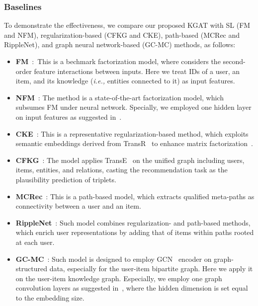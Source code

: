 \documentclass[sigconf]{acmart}
\newcommand{\ie}{\emph{i.e., }}
\theoremstyle{definition}
\begin{document}
\subsubsection{\textbf{Baselines}}
To demonstrate the effectiveness, we compare our proposed KGAT with SL (FM and NFM), regularization-based (CFKG and CKE), path-based (MCRec and RippleNet), and graph neural network-based (GC-MC) methods, as follows:

\begin{itemize}[leftmargin=*]
	\item \textbf{FM}~\cite{FM}:~This is a bechmark factorization model, where considers the second-order feature interactions between inputs. Here we treat IDs of a user, an item, and its knowledge (\ie entities connected to it) as input features.
	
	\item \textbf{NFM}~\cite{NFM}: The method is a state-of-the-art factorization model, which subsumes FM under neural network. Specially, we employed one hidden layer on input features as suggested in~\cite{NFM}.
	
	\item \textbf{CKE}~\cite{CKE}: This is a representative regularization-based method, which exploits semantic embeddings derived from TransR~\cite{TransR} to enhance matrix factorization~\cite{BPRMF}.
    
    \item \textbf{CFKG}~\cite{CFKG}: The model applies TransE~\cite{TransE} on the unified graph including users, items, entities, and relations, casting the recommendation task as the plausibility prediction of  triplets.
    
    \item \textbf{MCRec}~\cite{MCRec}: This is a path-based model, which extracts qualified meta-paths as connectivity between a user and an item.
    
	\item \textbf{RippleNet}~\cite{RippleNet}: Such model combines regularization- and path-based methods, which enrich user representations by adding that of items within paths rooted at each user.
	
	\item \textbf{GC-MC}~\cite{GC-MC}: Such model is designed to employ GCN~\cite{GCN} encoder on graph-structured data, especially for the user-item bipartite graph. Here we apply it on the user-item knowledge graph. Especially, we employ one graph convolution layers as suggested in~\cite{GC-MC}, where the hidden dimension is set equal to the embedding size.
\end{itemize}
\end{document}

